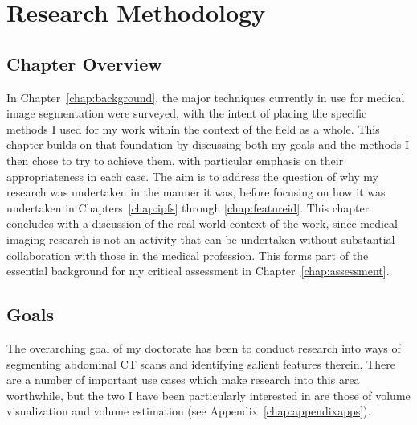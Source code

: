 \chapter{Research Methodology}
\label{chap:methodology}

\section{Chapter Overview}

In Chapter~\ref{chap:background}, the major techniques currently in use for medical image segmentation were surveyed, with the intent of placing the specific methods I used for my work within the context of the field as a whole. This chapter builds on that foundation by discussing both my goals and the methods I then chose to try to achieve them, with particular emphasis on their appropriateness in each case. The aim is to address the question of why my research was undertaken in the manner it was, before focusing on how it was undertaken in Chapters~\ref{chap:ipfs} through \ref{chap:featureid}. This chapter concludes with a discussion of the real-world context of the work, since medical imaging research is not an activity that can be undertaken without substantial collaboration with those in the medical profession. This forms part of the essential background for my critical assessment in Chapter~\ref{chap:assessment}.

\section{Goals}

The overarching goal of my doctorate has been to conduct research into ways of segmenting abdominal CT scans and identifying salient features therein. There are a number of important use cases which make research into this area worthwhile, but the two I have been particularly interested in are those of volume visualization and volume estimation (see Appendix~\ref{chap:appendixapps}).

